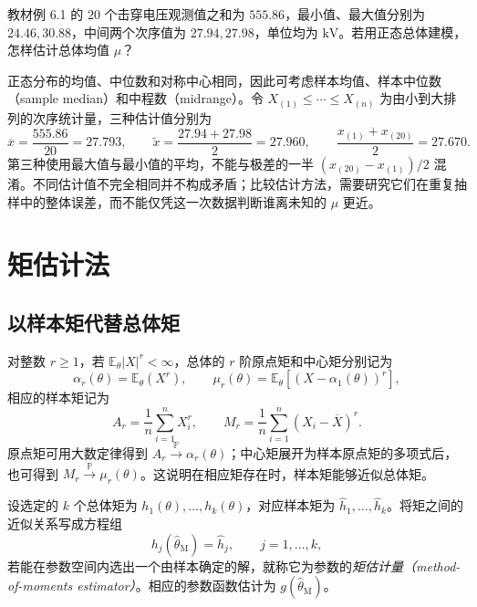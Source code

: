\begin{example}
\label{ex:study-voltage-estimators}
教材例 6.1 的 $20$ 个击穿电压观测值之和为 $555.86$，最小值、最大值分别为 $24.46,30.88$，中间两个次序值为 $27.94,27.98$，单位均为 $\mathrm{kV}$。若用正态总体建模，怎样估计总体均值 $\mu$？
\end{example}

\begin{solve}
正态分布的均值、中位数和对称中心相同，因此可考虑样本均值、样本中位数（sample median）和中程数（midrange）。令 $X_{(1)}\le\cdots\le X_{(n)}$ 为由小到大排列的次序统计量，三种估计值分别为
\[
  \overline x=\frac{555.86}{20}=27.793,\qquad
  \widetilde x=\frac{27.94+27.98}{2}=27.960,\qquad
  \frac{x_{(1)}+x_{(20)}}2=27.670.
\]
第三种使用最大值与最小值的平均，不能与极差的一半 $(x_{(20)}-x_{(1)})/2$ 混淆。不同估计值不完全相同并不构成矛盾；比较估计方法，需要研究它们在重复抽样中的整体误差，而不能仅凭这一次数据判断谁离未知的 $\mu$ 更近。
\end{solve}

\section{矩估计法}
\label{sec:study-method-of-moments}

\subsection{以样本矩代替总体矩}

对整数 $r\ge1$，若 $\mathbb E_\theta|X|^r<\infty$，总体的 $r$ 阶原点矩和中心矩分别记为
\[
  \alpha_r(\theta)=\mathbb E_\theta(X^r),\qquad
  \mu_r(\theta)=\mathbb E_\theta[(X-\alpha_1(\theta))^r],
\]
相应的样本矩记为
\begin{equation}
  A_r=\frac1n\sum_{i=1}^nX_i^r,\qquad
  M_r=\frac1n\sum_{i=1}^n(X_i-\overline X)^r.
  \label{eq:study-sample-moments}
\end{equation}
原点矩可用大数定律得到 $A_r\xrightarrow{\mathbb P}\alpha_r(\theta)$；中心矩展开为样本原点矩的多项式后，也可得到 $M_r\xrightarrow{\mathbb P}\mu_r(\theta)$。这说明在相应矩存在时，样本矩能够近似总体矩。

\begin{definition}[矩估计]
\label{def:study-moment-estimator}
设选定的 $k$ 个总体矩为 $h_1(\theta),\ldots,h_k(\theta)$，对应样本矩为 $\widehat h_1,\ldots,\widehat h_k$。将矩之间的近似关系写成方程组
\begin{equation}
  h_j(\widehat\theta_{\mathrm M})=\widehat h_j,
  \qquad j=1,\ldots,k,
  \label{eq:study-moment-equations}
\end{equation}
若能在参数空间内选出一个由样本确定的解，就称它为参数的\emph{矩估计量（method-of-moments estimator）}。相应的参数函数估计为 $g(\widehat\theta_{\mathrm M})$。
\end{definition}

